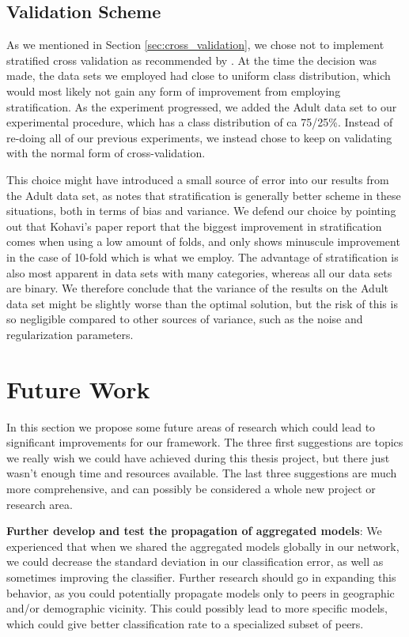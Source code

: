 \subsection{Validation Scheme}
As we mentioned in Section \ref{sec:cross_validation}, we chose not to implement stratified cross validation as recommended by \cite{kohavi1995crossvalidation}. At the time the decision was made, the data sets we employed had close to uniform class distribution, which would most likely not gain any form of improvement from employing stratification. As the experiment progressed, we added the Adult data set to our experimental procedure, which has a class distribution of ca 75/25\%. Instead of re-doing all of our previous experiments, we instead chose to keep on validating with the normal form of cross-validation. 

This choice might have introduced a small source of error into our results from the Adult data set, as \cite{kohavi1995crossvalidation} notes that stratification is generally better scheme in these situations, both in terms of bias and variance. We defend our choice by pointing out that Kohavi's paper report that the biggest improvement in stratification comes when using a low amount of folds, and only shows minuscule improvement in the case of 10-fold which is what we employ. The advantage of stratification is also most apparent in data sets with many categories, whereas all our data sets are binary. We therefore conclude that the variance of the results on the Adult data set might be slightly worse than the optimal solution, but the risk of this is so negligible compared to other sources of variance, such as the noise and regularization parameters.     

\section{Future Work} \label{sec:Future Work}
In this section we propose some future areas of research which could lead to significant improvements for our framework. The three first suggestions are topics we really wish we could have achieved during this thesis project, but there just wasn't enough time and resources available. The last three suggestions are much more comprehensive, and can possibly be considered a whole new project or research area.  

\vspace{2mm}
\noindent
\textbf{Further develop and test the propagation of aggregated models}: We experienced that when we shared the aggregated models globally in our network, we could decrease the standard deviation in our classification error, as well as sometimes improving the classifier. Further research should go in expanding this behavior, as you could potentially propagate models only to peers in geographic and/or demographic vicinity. This could possibly lead to more specific models, which could give better classification rate to a specialized subset of peers. 

